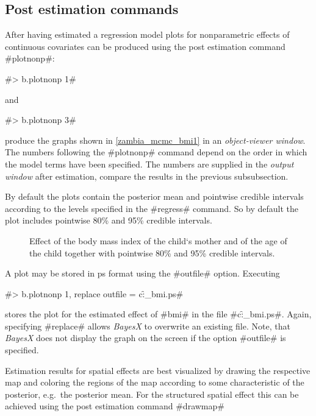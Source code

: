 \documentclass[11pt,a4paper,twoside]{bayesxreport}
\begin{document}
\subsection{Post estimation commands}

After having estimated a regression model plots for nonparametric
effects of continuous covariates can be produced using the post
estimation command #plotnonp#:

#> b.plotnonp 1#

and

#> b.plotnonp 3#

produce the graphs shown in \autoref{zambia_mcmc_bmi1} in an {\it
object-viewer window}. The numbers following the #plotnonp# command
depend on the order in which the model terms have been specified.
The numbers are supplied in the {\em output window} after
estimation, compare the results in the previous subsubsection.

By default the plots contain the posterior mean and pointwise
credible intervals according to the levels specified in the
#regress# command. So by default the plot includes pointwise 80\%
and 95\% credible intervals.

\begin{figure}[ht]
\begin{center}
{\it\caption{Effect of the body mass index of the child`s mother and
of the age of the child together with pointwise 80\% and 95\%
credible intervals. \label{zambia_mcmc_bmi1}}}
\end{center}
\end{figure}

A plot may be stored in ps format using the #outfile# option.
Executing

#> b.plotnonp 1, replace outfile = c:\data\f_bmi.ps#

stores the plot for the estimated effect of #bmi# in the file
#c:\data\f_bmi.ps#. Again, specifying #replace# allows {\it BayesX}
to overwrite an existing file. Note, that {\it BayesX} does not
display the graph on the screen if the option #outfile# is
specified.

Estimation results for spatial effects are best visualized by
drawing the respective map and coloring the regions of the map
according to some characteristic of the posterior, e.g.~the
posterior mean. For the structured spatial effect this can be
achieved using the post estimation command #drawmap#
\end{document}
